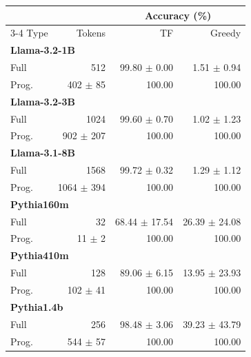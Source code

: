 \begin{tabular}{lrrr}
\toprule
 & & \multicolumn{2}{c}{Accuracy (\%)} \\
\cmidrule(lr){3-4}
 Type                                           & Tokens                  & TF                         & Greedy                     \\
\midrule
 \multicolumn{4}{l}{\textbf{Llama-3.2-1B}} \\
 Full                                           & 512                     & 99.80 {\small $\pm$ 0.00}  & 1.51 {\small $\pm$ 0.94}   \\
 Prog.                                          & 402 {\small $\pm$ 85}   & 100.00                     & 100.00                     \\
 \midrule
 \multicolumn{4}{l}{\textbf{Llama-3.2-3B}} \\
 Full                                           & 1024                    & 99.60 {\small $\pm$ 0.70}  & 1.02 {\small $\pm$ 1.23}   \\
 Prog.                                          & 902 {\small $\pm$ 207}  & 100.00                     & 100.00                     \\
 \midrule
 \multicolumn{4}{l}{\textbf{Llama-3.1-8B}} \\
 Full                                           & 1568                    & 99.72 {\small $\pm$ 0.32}  & 1.29 {\small $\pm$ 1.12}   \\
 Prog.                                          & 1064 {\small $\pm$ 394} & 100.00                     & 100.00                     \\
 \midrule \midrule
 \multicolumn{4}{l}{\textbf{Pythia160m}} \\
 Full                                           & 32                      & 68.44 {\small $\pm$ 17.54} & 26.39 {\small $\pm$ 24.08} \\
 Prog.                                          & 11 {\small $\pm$ 2}     & 100.00                     & 100.00                     \\
 \midrule
 \multicolumn{4}{l}{\textbf{Pythia410m}} \\
 Full                                           & 128                     & 89.06 {\small $\pm$ 6.15}  & 13.95 {\small $\pm$ 23.93} \\
 Prog.                                          & 102 {\small $\pm$ 41}   & 100.00                     & 100.00                     \\
 \midrule
 \multicolumn{4}{l}{\textbf{Pythia1.4b}} \\
 Full                                           & 256                     & 98.48 {\small $\pm$ 3.06}  & 39.23 {\small $\pm$ 43.79} \\
 Prog.                                          & 544 {\small $\pm$ 57}   & 100.00                     & 100.00                     \\
\bottomrule
\end{tabular}
